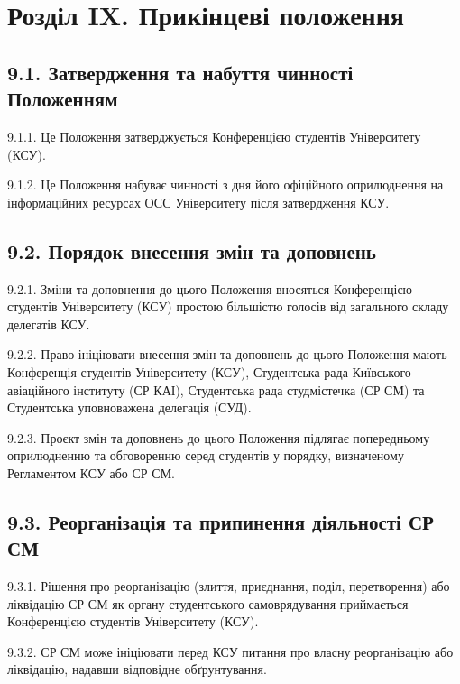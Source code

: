 \section*{Розділ IX. Прикінцеві положення}

\subsection*{9.1. Затвердження та набуття чинності Положенням}
    9.1.1. Це Положення затверджується Конференцією студентів Університету (КСУ).

    9.1.2. Це Положення набуває чинності з дня його офіційного оприлюднення на інформаційних ресурсах ОСС Університету після затвердження КСУ.

\subsection*{9.2. Порядок внесення змін та доповнень}
    9.2.1. Зміни та доповнення до цього Положення вносяться Конференцією студентів Університету (КСУ) простою більшістю голосів від загального складу делегатів КСУ.

    9.2.2. Право ініціювати внесення змін та доповнень до цього Положення мають Конференція студентів Університету (КСУ), Студентська рада Київського авіаційного інституту (СР КАІ), Студентська рада студмістечка (СР СМ) та Студентська уповноважена делегація (СУД).

    9.2.3. Проєкт змін та доповнень до цього Положення підлягає попередньому оприлюдненню та обговоренню серед студентів у порядку, визначеному Регламентом КСУ або СР СМ.

\subsection*{9.3. Реорганізація та припинення діяльності СР СМ}
    9.3.1. Рішення про реорганізацію (злиття, приєднання, поділ, перетворення) або ліквідацію СР СМ як органу студентського самоврядування приймається Конференцією студентів Університету (КСУ).

    9.3.2. СР СМ може ініціювати перед КСУ питання про власну реорганізацію або ліквідацію, надавши відповідне обґрунтування.

